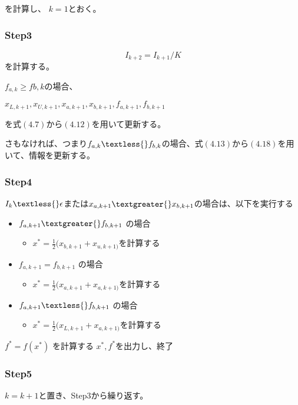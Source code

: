 を計算し、 $k = 1$とおく。

\subsubsection*{Step3}\label{step3}

$$ I_{k+2} = I_{k+1} / K $$ を計算する。

$f_{a,k} \geq f{b,k}$の場合、

$x_{L,k+1}, x_{U,k+1}, x_{a,k+1}, x_{b,k+1}, f_{a,k+1},
f_{b,k+1}$

を式$(4.7)$から$(4.12)$を用いて更新する。

さもなければ、つまり$f_{a,k} \textless{}
f_{b,k}$の場合、式$(4.13)$から$(4.18)$を用いて、情報を更新する。

\subsubsection*{Step4}\label{step4}

$I_k \textless{} \epsilon$または$x_{a,k+1}
\textgreater{} x_{b,k+1}$の場合は、以下を実行する

\begin{itemize}
\tightlist
\item
  $f_{a,k+1} \textgreater{} f_{b,k+1}$ の場合

  \begin{itemize}
  \tightlist
  \item
    $x^\ast =
    \frac{1}{2}(x_{b,k+1} +
    x_{u,k+1)}$を計算する
  \end{itemize}
\item
  $f_{a,k+1} = f_{b,k+1}$ の場合

  \begin{itemize}
  \tightlist
  \item
    $x^\ast =
    \frac{1}{2}(x_{a,k+1} +
    x_{a,k+1)}$を計算する
  \end{itemize}
\item
  $f_{a,k+1} \textless{} f_{b,k+1}$ の場合

  \begin{itemize}
  \tightlist
  \item
    $x^\ast =
    \frac{1}{2}(x_{L,k+1} +
    x_{a,k+1)}$を計算する
  \end{itemize}
\end{itemize}

$f^\ast = f(x^\ast)$ を計算する
$x^\ast, f^\ast$を出力し、終了

\subsubsection*{Step5}\label{step5}

$k = k + 1$と置き、Step3から繰り返す。
